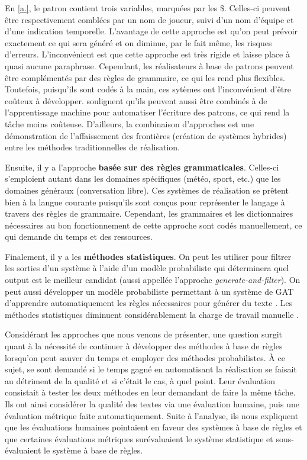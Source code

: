 En \ref{a.}, le patron contient trois variables, marquées par les \$. Celles-ci peuvent être respectivement comblées par un nom de joueur, suivi d'un nom d'équipe et d'une indication temporelle. L'avantage de cette approche est qu'on peut prévoir exactement ce qui sera généré et on diminue, par le fait même, les risques d'erreurs. L'inconvénient est que cette approche est très rigide et laisse place à quasi aucune paraphrase. Cependant, les réalisateurs à base de patrons peuvent être complémentés par des règles de grammaire, ce qui les rend plus flexibles. Toutefois, puisqu'ils sont codés à la main, ces sytèmes ont l'inconvénient d'être coûteux à développer. \cite{gatt18} soulignent qu'ils peuvent aussi être combinés à de l'apprentissage machine pour automatiser l'écriture des patrons, ce qui rend la tâche moins coûteuse. D'ailleurs, la combinaison d'approches est une démonstration de l'affaissement des frontières (création de systèmes hybrides) entre les méthodes traditionnelles de réalisation.

Ensuite, il y a l'approche \textbf{basée sur des règles grammaticales}. Celles-ci s'emploient autant dans les domaines spécifiques (météo, sport, etc.) que les domaines généraux (conversation libre). Ces systèmes de réalisation se prêtent bien à la langue courante puisqu'ils sont conçus pour représenter le langage à travers des règles de grammaire. Cependant, les grammaires et les dictionnaires nécessaires au bon fonctionnement de cette approche sont codés manuellement, ce qui demande du temps et des ressources.

Finalement, il y a les \textbf{méthodes statistiques}. On peut les utiliser pour filtrer les sorties d'un système à l'aide d'un modèle probabiliste qui déterminera quel output est le meilleur candidat \citep{LangkildeForestbasedStatisticalSentence2000} (aussi appellée l'approche \emph{generate-and-filter}). On peut aussi développer un modèle probabiliste permettant à un système de \ac{GAT} d'apprendre automatiquement les règles nécessaires pour générer du texte \citep{WhiteMinimalDependencyLength2012}. Les méthodes statistiques diminuent considérablement la charge de travail manuelle \citep{LangkildeForestbasedStatisticalSentence2000}.

Considérant les approches que nous venons de présenter, une question surgit quant à la nécessité de continuer à développer des méthodes à base de règles lorsqu'on peut sauver du temps et employer des méthodes probabilistes. À ce sujet, \cite{BelzSystemBuildingCost2009} se sont demandé si le temps gagné en automatisant la réalisation se faisait au détriment de la qualité et si c'était le cas, à quel point. Leur évaluation consistait à tester les deux méthodes en leur demandant de faire la même tâche. Ils ont ainsi considérer la qualité des textes via une évaluation humaine, puis une évaluation métrique faite automatiquement. Suite à l'analyse, ils nous expliquent que les évaluations humaines pointaient en faveur des systèmes à base de règles et que certaines évaluations métriques surévaluaient le système statistique et sous-évaluaient le système à base de règles.

